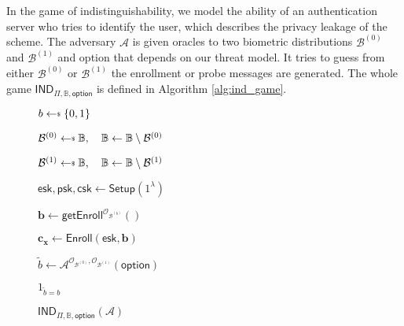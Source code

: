 In the game of indistinguishability, we model the ability of an authentication server who tries to identify the user, which describes the privacy leakage of the scheme. The adversary $\mathcal{A}$ is given oracles to two biometric distributions $\mathcal{B}^{(0)}$ and $ \mathcal{B}^{(1)}$ and \textsf{option} that depends on our threat model. It tries to guess from either $\mathcal{B}^{(0)}$ or $ \mathcal{B}^{(1)}$ the enrollment or probe messages are generated. The whole game $\textsf{IND}_{\Pi, \mathbb{B}, \textsf{option}}$ is defined in Algorithm \ref{alg:ind_game}.

\begin{figure}[h]
\centering

	\begin{minipage}[t]{0.55\textwidth}
	\begin{algorithm}[H]
	\caption{$\textsf{IND}_{\Pi, \mathbb{B}, \textsf{option}}(\mathcal{A})$}
	\label{alg:ind_game}
	\begin{algorithmic}[1]
		\State $b \getsdollar \{0, 1\}$

		\State $\mathcal{B}^{(0)} \getsdollar \mathbb{B}, \quad \mathbb{B} \gets \mathbb{B} \setminus \mathcal{B}^{(0)}$

		\State $\mathcal{B}^{(1)} \getsdollar \mathbb{B}, \quad \mathbb{B} \gets \mathbb{B} \setminus \mathcal{B}^{(1)}$

		\State $\textsf{esk}, \textsf{psk}, \textsf{csk} \gets \textsf{Setup}(1^\lambda)$

		\State $\mathbf{b} \gets \textsf{getEnroll}^{\mathcal{O}_{\mathcal{B}^{(b)}}}()$

		\State $\mathbf{c_x} \gets \textsf{Enroll}(\textsf{esk}, \mathbf{b})$


		


		

		
			\State $\tilde{b} \gets \mathcal{A}^{\mathcal{O}_{\mathcal{B}^{(0)}}, \mathcal{O}_{\mathcal{B}^{(1)}}} ( \textsf{option} )$

		\State \Return $1_{\tilde{b} = b}$
	\end{algorithmic}
	\end{algorithm}
	\end{minipage}

\label{fig:ind_game}
\end{figure}

